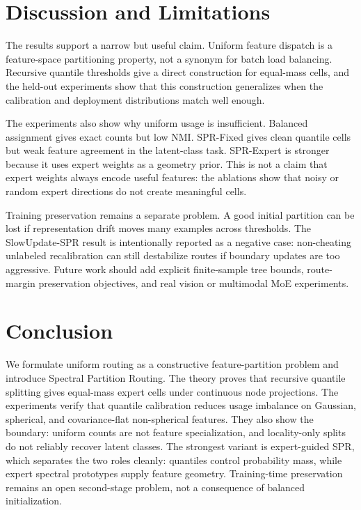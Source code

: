 \section{Discussion and Limitations}

The results support a narrow but useful claim.  Uniform feature dispatch is a
feature-space partitioning property, not a synonym for batch load balancing.
Recursive quantile thresholds give a direct construction for equal-mass cells,
and the held-out experiments show that this construction generalizes when the
calibration and deployment distributions match well enough.

The experiments also show why uniform usage is insufficient.  Balanced
assignment gives exact counts but low NMI.  SPR-Fixed gives clean quantile
cells but weak feature agreement in the latent-class task.  SPR-Expert is
stronger because it uses expert weights as a geometry prior.  This is not a
claim that expert weights always encode useful features: the ablations show
that noisy or random expert directions do not create meaningful cells.

Training preservation remains a separate problem.  A good initial partition can
be lost if representation drift moves many examples across thresholds.  The
SlowUpdate-SPR result is intentionally reported as a negative case: non-cheating
unlabeled recalibration can still destabilize routes if boundary updates are too
aggressive.  Future work should add explicit finite-sample tree bounds,
route-margin preservation objectives, and real vision or multimodal MoE
experiments.

\section{Conclusion}

We formulate uniform routing as a constructive feature-partition problem and
introduce Spectral Partition Routing.  The theory proves that recursive
quantile splitting gives equal-mass expert cells under continuous node
projections.  The experiments verify that quantile calibration reduces usage
imbalance on Gaussian, spherical, and covariance-flat non-spherical features.
They also show the boundary: uniform counts are not feature specialization, and
locality-only splits do not reliably recover latent classes.  The strongest
variant is expert-guided SPR, which separates the two roles cleanly: quantiles
control probability mass, while expert spectral prototypes supply feature
geometry.  Training-time preservation remains an open second-stage problem, not
a consequence of balanced initialization.
